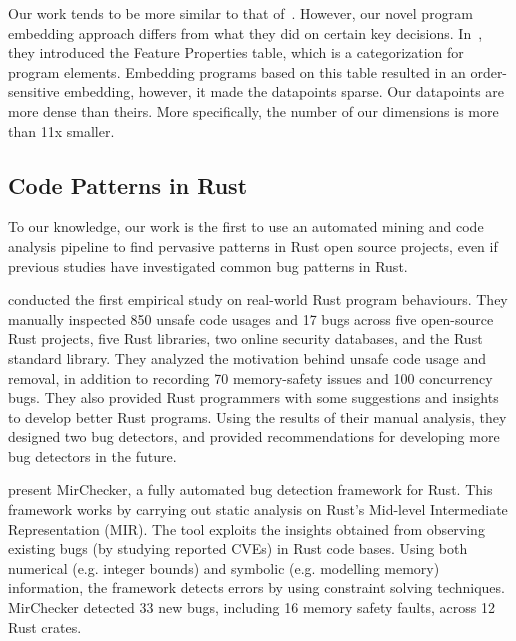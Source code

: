 Our work tends to be more similar to that of~\cite{hanam2016discovering}. However, our novel program embedding approach differs from what they did on certain key decisions. In~\cite{hanam2016discovering}, they introduced the Feature Properties table, which is a categorization for program elements. Embedding programs based on this table resulted in an order-sensitive embedding, however, it made the datapoints sparse. Our datapoints are more dense than theirs. More specifically, the number of our dimensions is more than 11x smaller.

\subsection{Code Patterns in Rust}

To our knowledge, our work is the first to use an automated mining and code analysis pipeline to find pervasive patterns in Rust open source projects, even if previous studies have investigated common bug patterns in Rust.

\cite{qin2020understanding} conducted the first empirical study on real-world Rust program behaviours. They manually inspected 850 unsafe code usages and 17 bugs across five open-source Rust projects, five Rust libraries, two online security databases, and the Rust standard library. They analyzed the motivation behind unsafe code usage and removal, in addition to recording 70 memory-safety issues and 100 concurrency bugs. They also provided Rust programmers with some suggestions and insights to develop better Rust programs. Using the results of their manual analysis, they designed two bug detectors, and provided recommendations for developing more bug detectors in the future.

\cite{li2021mirchecker} present MirChecker, a fully automated bug detection framework for Rust. This framework works by carrying out static analysis on Rust's Mid-level Intermediate Representation (MIR). The tool exploits the insights obtained from observing existing bugs (by studying reported CVEs) in Rust code bases. Using both numerical (e.g. integer bounds) and symbolic (e.g. modelling memory) information, the framework detects errors by using constraint solving techniques. MirChecker detected 33 new bugs, including 16 memory safety faults, across 12 Rust crates.

